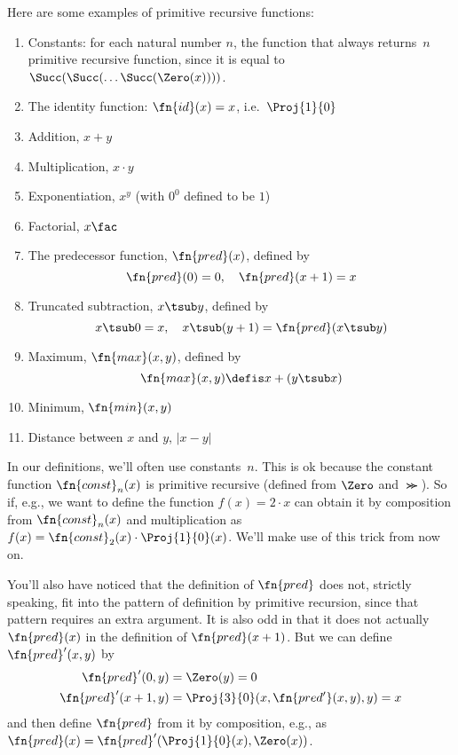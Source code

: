 \documentclass[../../../include/open-logic-section]{subfiles}
\begin{document}


Here are some examples of primitive recursive functions:
\begin{enumerate}
\item Constants: for each natural number $n$, the function that always
  returns~$n$ primitive recursive function, since it is equal to
  $\Succ(\Succ(\dots \Succ(\Zero(x))))$.

\item The identity function: $\fn{id}(x) = x$, i.e.\ $\Proj{1}{0}$

\item Addition, $x+y$

\item Multiplication, $x \cdot y$

\item Exponentiation, $x^y$ (with $0^0$ defined to be $1$)

\item Factorial, $x\fac$

\item The predecessor function, $\fn{pred}(x)$, defined by
\[
\fn{pred}(0) = 0, \quad \fn{pred}(x+1) = x
\]

\item Truncated subtraction, $x \tsub y$, defined by
\[
x \tsub 0 = x, \quad x \tsub (y+1) = \fn{pred}(x \tsub y)
\]

\item Maximum, $\fn{max}(x,y)$, defined by
\[
\fn{max}(x,y) \defis x + (y \tsub x)
\]

\item Minimum, $\fn{min}(x,y)$

\item Distance between $x$ and $y$, $\left|x-y\right|$
\end{enumerate}

\begin{explain}
In our definitions, we'll often use constants~$n$. This is ok because
the constant function $\fn{const}_n(x)$ is primitive recursive
(defined from $\Zero$ and $\Succ$). So if, e.g., we want to define the
function $f(x) = 2 \cdot x$ can obtain it by composition from
$\fn{const}_n(x)$ and multiplication as $f(x) = \fn{const}_2(x) \cdot
\Proj{1}{0}(x)$. We'll make use of this trick from now on.
  
You'll also have noticed that the definition of $\fn{pred}$ does not,
strictly speaking, fit into the pattern of definition by primitive
recursion, since that pattern requires an extra argument. It is also
odd in that it does not actually $\fn{pred}(x)$ in the definition of
$\fn{pred}(x+1)$. But we can define $\fn{pred}'(x, y)$ by
\begin{align*}
  \fn{pred}'(0, y) & = \Zero(y) = 0\\
  \fn{pred}'(x+1, y) & = \Proj{3}{0}(x, \fn{pred'}(x, y), y) = x
\end{align*}
and then define $\fn{pred}$ from it by composition, e.g., as $\fn{pred}(x) =
\fn{pred}'(\Proj{1}{0}(x), \Zero(x))$.
\end{explain}
\end{document}
